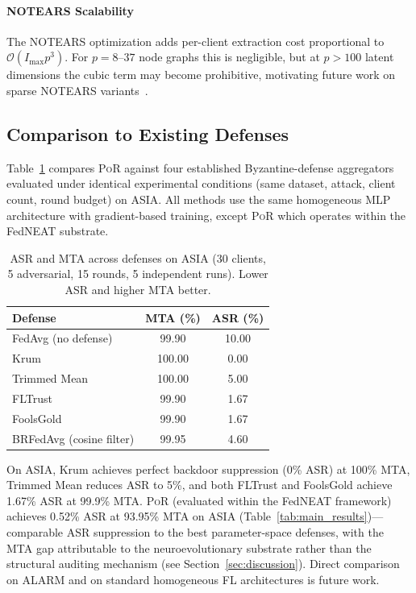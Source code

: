 \documentclass[journal]{IEEEtran}
\newcommand{\por}{\textsc{PoR}}
\newcommand{\notears}{\textsc{NOTEARS}}
\begin{document}
\paragraph{NOTEARS Scalability}
The \notears{} optimization adds per-client extraction cost proportional
to $\mathcal{O}(I_{\max} p^3)$. For $p = 8$--$37$ node graphs this is
negligible, but at $p > 100$ latent dimensions the cubic term may become
prohibitive, motivating future work on sparse
\notears{} variants~\cite{lachapelle2019grandag}.

\subsection{Comparison to Existing Defenses}

Table~\ref{tab:defense_failure} compares \por{} against four established
Byzantine-defense aggregators evaluated under identical experimental
conditions (same dataset, attack, client count, round budget) on ASIA.
All methods use the same homogeneous MLP architecture with gradient-based
training, except \por{} which operates within the FedNEAT substrate.

\begin{table}[!tp]
\centering
\caption{ASR and MTA across defenses on ASIA (30 clients, 5 adversarial,
         15 rounds, 5 independent runs). Lower ASR and higher MTA better.}
\label{tab:defense_failure}
\renewcommand{\arraystretch}{1.3}
\begin{tabular}{lcc}
\toprule
\textbf{Defense}     & \textbf{MTA (\%)} & \textbf{ASR (\%)} \\
\midrule
FedAvg (no defense)  & 99.90 & 10.00 \\
Krum~\cite{blanchard2017krum} & 100.00 & 0.00 \\
Trimmed Mean~\cite{yin2018byzantinerobust} & 100.00 & 5.00 \\
FLTrust~\cite{cao2021fltrust} & 99.90 & 1.67 \\
FoolsGold~\cite{fung2020foolsgold} & 99.90 & 1.67 \\
BRFedAvg (cosine filter) & 99.95 & 4.60 \\
\bottomrule
\end{tabular}
\end{table}

On ASIA, Krum achieves perfect backdoor suppression (0\% ASR) at
100\% MTA, Trimmed Mean reduces ASR to 5\%, and both FLTrust and
FoolsGold achieve 1.67\% ASR at 99.9\% MTA. \por{} (evaluated within
the FedNEAT framework) achieves 0.52\% ASR at 93.95\% MTA on ASIA
(Table~\ref{tab:main_results})---comparable ASR suppression to the best
parameter-space defenses, with the MTA gap attributable to the
neuroevolutionary substrate rather than the structural auditing mechanism
(see Section~\ref{sec:discussion}). Direct comparison on ALARM and on
standard homogeneous FL architectures is future work.
\end{document}
